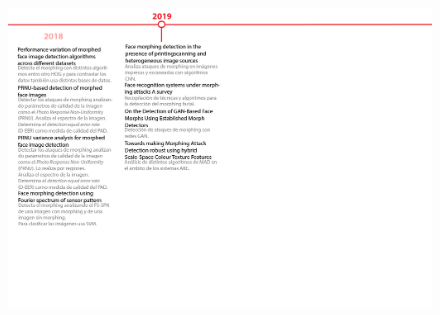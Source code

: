 \begin{landscape}
 \begin{figure}
  \centering
  \includegraphics[width=1.4\textwidth]{ch-sistemasABC/images/ch-ImagenesApendices/CRONOLOGIA_MORPHING-03.png}
  \label{fig:02_CRONOLOGIA_MORPHING}
 \end{figure}
\end{landscape}


















